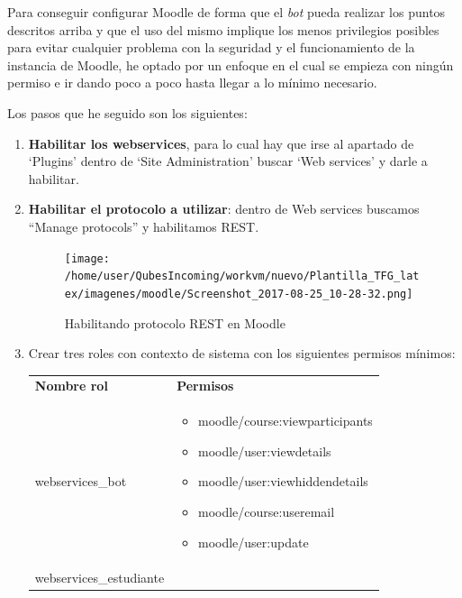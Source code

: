 Para conseguir configurar Moodle de forma que el \textit{bot} pueda realizar los puntos descritos arriba y que el uso del mismo implique los menos privilegios posibles para evitar cualquier problema con la seguridad y el funcionamiento de la instancia de Moodle, he optado por un enfoque en el cual se empieza con ningún permiso e ir dando poco a poco hasta llegar a lo mínimo necesario.
\par
Los pasos que he seguido son los siguientes:
\begin{enumerate}
\item \textbf{Habilitar los webservices}, para lo cual hay que irse al apartado de \enquote*{Plugins} dentro de \enquote*{Site Administration} buscar \enquote*{Web services} y darle a habilitar.

\item \textbf{Habilitar el protocolo a utilizar}: dentro de Web services buscamos \enquote{Manage protocols} y habilitamos REST.
\begin{figure}[H] %
\centering
\texttt{[image: /home/user/QubesIncoming/workvm/nuevo/Plantilla\_TFG\_latex/imagenes/moodle/Screenshot\_2017-08-25\_10-28-32.png]}  %

\caption{Habilitando protocolo REST en Moodle}\label{figura410}
\end{figure}
\item Crear tres roles con contexto de sistema con los siguientes permisos mínimos:


\begin{tabular}{|p{5cm}|p{8cm}|}
\hline
\textbf{Nombre rol}
\newline

 &
 
\textbf{Permisos}
  \\
webservices\_bot
\newline

 &
 
\begin{itemize}
\item moodle/course:viewparticipants
\item moodle/user:viewdetails
\item moodle/user:viewhiddendetails
\item moodle/course:useremail
\item moodle/user:update

\end{itemize}
  \\
webservices\_estudiante
\newline


\end{tabular}
\end{enumerate}

